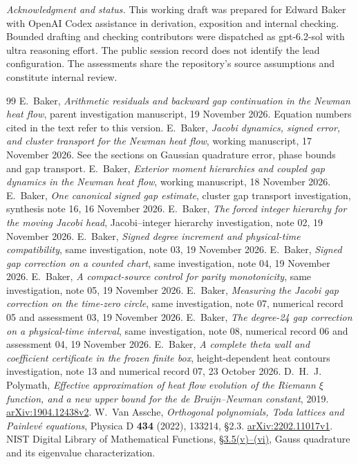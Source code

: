 \medskip
\noindent\textit{Acknowledgment and status.} This working draft was prepared for Edward Baker with OpenAI Codex assistance in derivation, exposition and internal checking. Bounded drafting and checking contributors were dispatched as gpt-6.2-sol with ultra reasoning effort. The public session record does not identify the lead configuration. The assessments share the repository's source assumptions and constitute internal review.

\begin{thebibliography}{99}
\footnotesize
\setlength{\itemsep}{1.7pt plus 0.5pt}
 E.~Baker, \emph{Arithmetic residuals and backward gap continuation in the Newman heat flow}, parent investigation manuscript, 19 November 2026. Equation numbers cited in the text refer to this version.
 E.~Baker, \emph{Jacobi dynamics, signed error, and cluster transport for the Newman heat flow}, working manuscript, 17 November 2026. See the sections on Gaussian quadrature error, phase bounds and gap transport.
 E.~Baker, \emph{Exterior moment hierarchies and coupled gap dynamics in the Newman heat flow}, working manuscript, 18 November 2026.
 E.~Baker, \emph{One canonical signed gap estimate}, cluster gap transport investigation, synthesis note 16, 16 November 2026.
 E.~Baker, \emph{The forced integer hierarchy for the moving Jacobi head}, Jacobi--integer hierarchy investigation, note 02, 19 November 2026.
 E.~Baker, \emph{Signed degree increment and physical-time compatibility}, same investigation, note 03, 19 November 2026.
 E.~Baker, \emph{Signed gap correction on a counted chart}, same investigation, note 04, 19 November 2026.
 E.~Baker, \emph{A compact-source control for parity monotonicity}, same investigation, note 05, 19 November 2026.
 E.~Baker, \emph{Measuring the Jacobi gap correction on the time-zero circle}, same investigation, note 07, numerical record 05 and assessment 03, 19 November 2026.
 E.~Baker, \emph{The degree-24 gap correction on a physical-time interval}, same investigation, note 08, numerical record 06 and assessment 04, 19 November 2026.
 E.~Baker, \emph{A complete theta wall and coefficient certificate in the frozen finite box}, height-dependent heat contours investigation, note 13 and numerical record 07, 23 October 2026.
 D.~H.~J. Polymath, \emph{Effective approximation of heat flow evolution of the Riemann \(\xi\) function, and a new upper bound for the de Bruijn--Newman constant}, 2019. \href{https://arxiv.org/abs/1904.12438v2}{arXiv:1904.12438v2}.
 W.~Van Assche, \emph{Orthogonal polynomials, Toda lattices and Painlev\'e equations}, Physica D \textbf{434} (2022), 133214, \S2.3. \href{https://arxiv.org/abs/2202.11017v1}{arXiv:2202.11017v1}.
 NIST Digital Library of Mathematical Functions, \href{https://dlmf.nist.gov/3.5}{\S3.5(v)--(vi)}, Gauss quadrature and its eigenvalue characterization.
\end{thebibliography}

